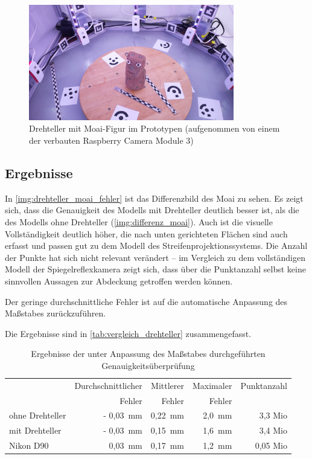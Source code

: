 \documentclass[./00PhotoBox.tex]{subfiles}
\begin{document}
\begin{figure}
    \centering
    \includegraphics[width=0.8\textwidth]{img/drehteller_moai.jpg}
    \caption{Drehteller mit Moai-Figur im Prototypen (aufgenommen von einem der verbauten Raspberry Camera Module 3)}
    \label{img:drehteller_moai}
\end{figure}

\subsection{Ergebnisse}

In \autoref{img:drehteller_moai_fehler} ist das Differenzbild des Moai zu sehen. Es zeigt sich, dass die Genauigkeit des Modells mit Drehteller deutlich besser ist, als die des Modells ohne Drehteller (\autoref{img:differenz_moai}). Auch ist die visuelle Vollständigkeit deutlich höher, die nach unten gerichteten Flächen sind auch erfasst und passen gut zu dem Modell des Streifenprojektionssystems. Die Anzahl der Punkte hat sich nicht relevant verändert -- im Vergleich zu dem vollständigen Modell der Spiegelreflexkamera zeigt sich, dass über die Punktanzahl selbst keine sinnvollen Aussagen zur Abdeckung getroffen werden können.

Der geringe durchschnittliche Fehler ist auf die automatische Anpassung des Maßstabes zurückzuführen.

Die Ergebnisse sind in \autoref{tab:vergleich_drehteller} zusammengefasst.

\begin{table}
    \centering
    \caption{Ergebnisse der unter Anpassung des Maßstabes durchgeführten Genauigkeitsüberprüfung}
    \label{tab:vergleich_drehteller}
    \begin{tabular}{l|r|r|r|r}
        \toprule
                        & Durchschnittlicher & Mittlerer & Maximaler & Punktanzahl \\
                        & Fehler             & Fehler    & Fehler    &             \\
        \midrule
        ohne Drehteller & - 0,03~mm          & 0,22~mm   & 2,0~mm    & 3,3 Mio     \\
        mit Drehteller  & - 0,03~mm          & 0,15~mm   & 1,6~mm    & 3,4 Mio     \\
        Nikon D90       & 0,03~mm            & 0,17~mm   & 1,2~mm    & 0,05 Mio    \\
        \bottomrule
    \end{tabular}
\end{table}
\end{document}
